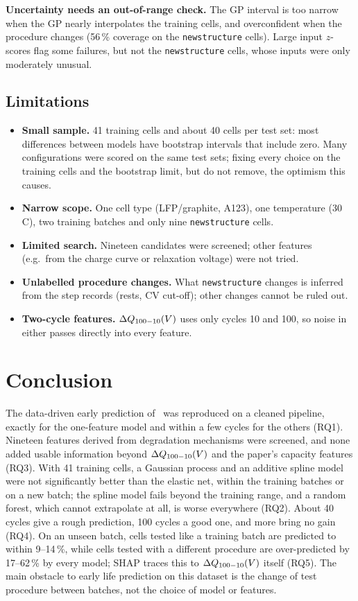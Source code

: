 \textbf{Uncertainty needs an out-of-range check.} The GP interval is
too narrow when the GP nearly interpolates the training cells, and
overconfident when the procedure changes (56\,\% coverage on the
\texttt{newstructure} cells). Large input $z$-scores flag some failures, but
not the \texttt{newstructure} cells, whose inputs were only moderately
unusual.

\subsection{Limitations}
\begin{itemize}
  \item \textbf{Small sample.} 41 training cells and about 40 cells per test
  set: most differences between models have bootstrap intervals that include
  zero. Many configurations were scored on the same test sets; fixing every choice on the training cells
  and the bootstrap limit, but do not remove, the optimism this causes.
  \item \textbf{Narrow scope.} One cell type (LFP/graphite, A123), one
  temperature (30\,\textdegree C), two training batches and only nine
  \texttt{newstructure} cells.
  \item \textbf{Limited search.} Nineteen candidates were screened; other
  features (e.g.\ from the charge curve or relaxation voltage) were not
  tried.
  \item \textbf{Unlabelled procedure changes.} What \texttt{newstructure}
  changes is inferred from the step records (rests, CV cut-off); other
  changes cannot be ruled out.
  \item \textbf{Two-cycle features.} $\Delta Q_{100-10}(V)$ uses only cycles 10 and 100, so
  noise in either passes directly into every feature.
\end{itemize}

\section{Conclusion}
\label{sec:conclusion}
The data-driven early prediction of~\cite{severson2019} was reproduced on a
cleaned pipeline, exactly for the one-feature model and within a few cycles
for the others (RQ1). Nineteen features derived from degradation mechanisms
were screened, and none added usable information beyond $\Delta Q_{100-10}(V)$ and the
paper's capacity features (RQ3). With 41 training cells, a Gaussian process
and an additive spline model were not significantly better than the
elastic net, within the training batches or on a new batch; the spline
model fails beyond the training range, and a random forest, which cannot
extrapolate at all, is worse everywhere (RQ2). About 40 cycles give a rough
prediction, 100 cycles a good one, and more bring no gain (RQ4). On an
unseen batch, cells tested like a training batch are predicted to within
9--14\,\%, while cells tested with a different procedure are over-predicted
by 17--62\,\% by every model; SHAP traces this to $\Delta Q_{100-10}(V)$ itself (RQ5). The
main obstacle to early life prediction on this dataset is the change of test
procedure between batches, not the choice of model or features.

